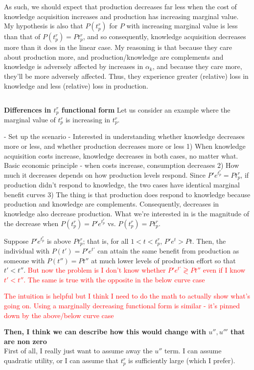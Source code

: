 \documentclass[source/paper/main.tex]{subfiles}
\begin{document}
As such, we should expect that production decreases far less when the cost of knowledge acquisition increases and production has increasing marginal value. My hypothesis is also that $P(t_p^r)$ for $P$ with increasing marginal value is less than that of $P(t_p^r) = P t_p^r$, and so consequently, knowledge acquisition decreases more than it does in the linear case. My reasoning is that because they care about production more, and production/knowledge are complements and knowledge is adversely affected by increases in $\alpha_k$, and because they care more, they'll be more adversely affected. Thus, they experience greater (relative) loss in knowledge and less (relative) loss in production. 
\subsection{}
\textbf{Differences in $t_p^r$ functional form}
Let us consider an example where the marginal value of $t_p^r$ is increasing in $t_p^r$. 

- Set up the scenario
- Interested in understanding whether knowledge decreases more or less, and whether production decreases more or less
1) When knowledge acquisition costs increase, knowledge decreases in both cases, no matter what. Basic economic principle - when costs increase, consumption decreases
2) How much it decreases depends on how production levels respond. Since $P' e^{t_p^r} = P t_p^r$, if production didn't respond to knowledge, the two cases have identical marginal benefit curves
3) The thing is that production does respond to knowledge because production and knowledge are complements. Consequently, decreases in knowledge also decrease production. What we're interested in is the magnitude of the decrease when $P(t_p^r) = P' e^{t_p^r}$ vs. $P(t_p^r) = P t_p^r$. 

Suppose $P' e^{t_p^r}$ is above $P t_p^r$; that is, for all $1<t < t_p^r$, $P' e^t > Pt$. Then, the individual with $P(t') = P' e^{t'}$ can attain the same benefit from production as someone with $P(t'') = P t''$ at much lower levels of production effort so that $t' < t''$. \textcolor{red}{But now the problem is I don't know whether $P' e^{t'} \gtrless P t''$ even if I know $t' < t''$. The same is true with the opposite in the below curve case}

\textcolor{red}{The intuition is helpful but I think I need to do the math to actually show what's going on. Using a marginally decreasing functional form is similar - it's pinned down by the above/below curve case}




\textbf{Then, I think we can describe how this would change with $u'', u'''$ that are non zero}\\
First of all, I really just want to assume away the $u''$ term. I can assume quadratic utility, or I can assume that $t_p^r$ is sufficiently large (which I prefer). 
\end{document}
